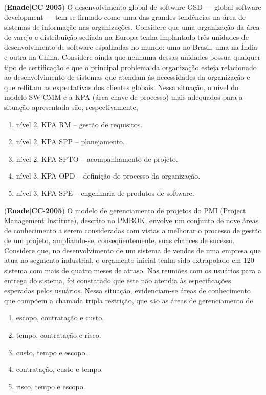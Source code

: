 \documentclass{exam}
\begin{document}
\begin{questions}
\begin{enumerate}[label=\alph*)]
	\end{enumerate}

\question (\textbf{Enade}$|$\textbf{CC}-\textbf{2005}) O desenvolvimento global de software GSD — global
software development — tem-se firmado como uma das
grandes tendências na área de sistemas de informação nas
organizações. Considere que uma organização da área de
varejo e distribuição sediada na Europa tenha implantado três
unidades de desenvolvimento de software espalhadas no
mundo: uma no Brasil, uma na Índia e outra na China.
Considere ainda que nenhuma dessas unidades possua
qualquer tipo de certificação e que o principal problema da
organização esteja relacionado ao desenvolvimento de
sistemas que atendam às necessidades da organização e que
reflitam as expectativas dos clientes globais.
Nessa situação, o nível do modelo SW-CMM e a KPA (área chave
de processo) mais adequados para a situação apresentada são,
respectivamente,
	\begin{enumerate}[label=\alph*)]
		\item  nível 2, KPA RM – gestão de requisitos.
		\item  nível 2, KPA SPP – planejamento.
		\item  nível 2, KPA SPTO – acompanhamento de projeto.
		\item  nível 3, KPA OPD – definição do processo da organização.
		\item  nível 3, KPA SPE – engenharia de produtos de software.

	\end{enumerate}

\question (\textbf{Enade}$|$\textbf{CC}-\textbf{2005}) O modelo de gerenciamento de projetos do PMI
(Project Management Institute), descrito no PMBOK, envolve
um conjunto de nove áreas de conhecimento a serem
consideradas com vistas a melhorar o processo de gestão de
um projeto, ampliando-se, conseqüentemente, suas chances
de sucesso. Considere que, no desenvolvimento de um
sistema de vendas de uma empresa que atua no segmento
industrial, o orçamento inicial tenha sido extrapolado em
120%
sistema com mais de quatro meses de atraso. Nas reuniões
com os usuários para a entrega do sistema, foi constatado que
este não atendia às especificações esperadas pelos usuários.
Nessa situação, evidenciam-se áreas de conhecimento que
compõem a chamada tripla restrição, que são as áreas de
gerenciamento de
	\begin{enumerate}[label=\alph*)]
		\item  escopo, contratação e custo.
		\item  tempo, contratação e risco.
		\item  custo, tempo e escopo.
		\item  contratação, custo e tempo.
		\item  risco, tempo e escopo.


\end{enumerate}
\end{questions}
\end{document}
